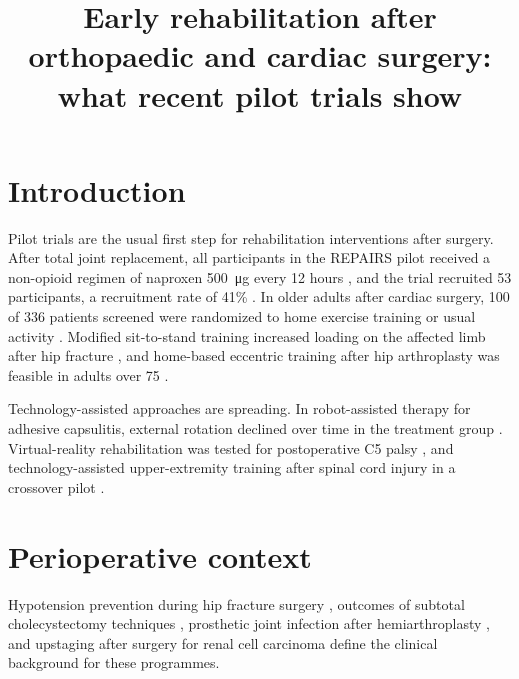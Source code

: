 \documentclass{article}
\title{Early rehabilitation after orthopaedic and cardiac surgery: what recent pilot trials show}
\author{}
\date{}
\begin{document}
\maketitle

\section{Introduction}
Pilot trials are the usual first step for rehabilitation interventions after surgery. After total joint replacement, all participants in the REPAIRS pilot received a non-opioid regimen of naproxen \SI{500}{\micro\gram} every 12 hours \cite{yang2025repairs}, and the trial recruited 53 participants, a recruitment rate of 41\% \cite{yang2025repairs}. In older adults after cardiac surgery, 100 of 336 patients screened were randomized to home exercise training or usual activity \cite{tamuleviciute2026}. Modified sit-to-stand training increased loading on the affected limb after hip fracture \cite{noda2022sts}, and home-based eccentric training after hip arthroplasty was feasible in adults over 75 \cite{lindgren2025}.

Technology-assisted approaches are spreading. In robot-assisted therapy for adhesive capsulitis, external rotation declined over time in the treatment group \cite{ryu2026robot}. Virtual-reality rehabilitation was tested for postoperative C5 palsy \cite{suk2025vr}, and technology-assisted upper-extremity training after spinal cord injury in a crossover pilot \cite{kilkki2025}.

\section{Perioperative context}
Hypotension prevention during hip fracture surgery \cite{luney2025}, outcomes of subtotal cholecystectomy techniques \cite{aloraini2025}, prosthetic joint infection after hemiarthroplasty \cite{mahmoud2025}, and upstaging after surgery for renal cell carcinoma \cite{goodstein2025} define the clinical background for these programmes.



\end{document}
